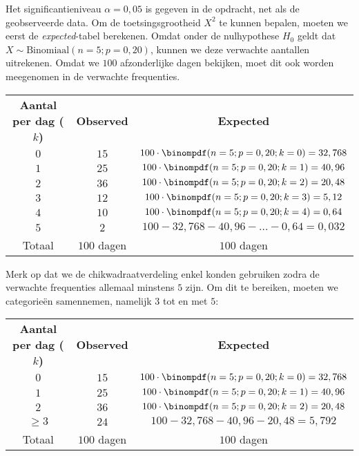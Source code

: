 {    Het significantieniveau $\alpha=0,05$ is gegeven in de opdracht, net als de geobserveerde data.
    Om de toetsingsgrootheid $X^2$ te kunnen bepalen, moeten we eerst de \emph{expected}-tabel berekenen.
    Omdat onder de nulhypothese $H_0$ geldt dat $X \sim \text{Binomiaal}(n=5; p=0,20)$, kunnen we deze verwachte aantallen uitrekenen. 
    Omdat we $100$ afzonderlijke dagen bekijken, moet dit ook worden meegenomen in de verwachte frequenties.   
    \begin{center}
        \begin{tabular}{ccc}
            \toprule
                {\bfseries Aantal per dag ($k$)} & {\bfseries Observed} & {\bfseries Expected} \\
            \cmidrule{1-1} \cmidrule{2-2} \cmidrule{3-3}
                $0$ & $15$ & $100 \cdot \binompdf(n=5; p=0,20; k=0) = 32,768$ \\
                $1$ & $25$ & $100 \cdot \binompdf(n=5; p=0,20; k=1) = 40,96$ \\
                $2$ & $36$ & $100 \cdot \binompdf(n=5; p=0,20; k=2) = 20,48$ \\
                $3$ & $12$ & $100 \cdot \binompdf(n=5; p=0,20; k=3) = 5,12$ \\
                $4$ & $10$ & $100 \cdot \binompdf(n=5; p=0,20; k=4) = 0,64$ \\
                $5$ & $2$  & $100 - 32,768 - 40,96 - \ldots - 0,64 = 0,032$ \\
            \cmidrule{1-1} \cmidrule{2-2} \cmidrule{3-3}
                Totaal & $100$ dagen & $100$ dagen \\
            \bottomrule
        \end{tabular}
    \end{center}
    Merk op dat we de chikwadraatverdeling enkel konden gebruiken zodra de verwachte frequenties allemaal minstens $5$ zijn.
    Om dit te bereiken, moeten we categorie\"en samennemen, namelijk $3$ tot en met $5$:
    \begin{center}
        \begin{tabular}{ccc}
            \toprule
                {\bfseries Aantal per dag ($k$)} & {\bfseries Observed} & {\bfseries Expected} \\
            \cmidrule{1-1} \cmidrule{2-2} \cmidrule{3-3}
                $0$ & $15$ & $100 \cdot \binompdf(n=5; p=0,20; k=0) = 32,768$ \\
                $1$ & $25$ & $100 \cdot \binompdf(n=5; p=0,20; k=1) = 40,96$ \\
                $2$ & $36$ & $100 \cdot \binompdf(n=5; p=0,20; k=2) = 20,48$ \\
                $\ge 3$ & $24$ & $100 - 32,768 - 40,96 - 20,48 = 5,792$ \\
            \cmidrule{1-1} \cmidrule{2-2} \cmidrule{3-3}
                Totaal & $100$ dagen & $100$ dagen \\
            \bottomrule
        \end{tabular}
    \end{center}

}
